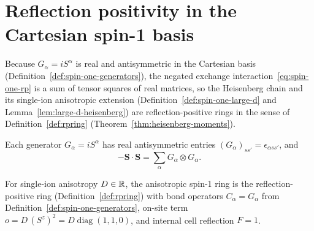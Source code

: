 \section{Reflection positivity in the Cartesian spin-1 basis}

Because \(G_\alpha = iS^\alpha\) is real and antisymmetric in the Cartesian basis
(Definition~\ref{def:spin-one-generators}), the negated exchange interaction~\eqref{eq:spin-one-rp}
is a sum of tensor squares of real matrices, so the Heisenberg chain and its single-ion anisotropic
extension (Definition~\ref{def:spin-one-large-d} and Lemma~\ref{lem:large-d-heisenberg}) are
reflection-positive rings in the sense of Definition~\ref{def:rpring}
(Theorem~\ref{thm:heisenberg-moments}).

\begin{definition}
  \label{def:spin-one-generators}
  \leanok
  Each generator \(G_\alpha = i S^\alpha\) has real antisymmetric entries \((G_\alpha)_{ss'} =
  \epsilon_{\alpha s s'}\), and
  \begin{equation}
    \label{eq:spin-one-rp}
    -\mathbf S \cdot \mathbf S = \sum_\alpha G_\alpha \otimes G_\alpha.
  \end{equation}
\end{definition}

\begin{definition}
  \label{def:spin-one-large-d}
  \leanok
  For single-ion anisotropy \(D \in \mathbb{R}\), the anisotropic spin-1 ring is the reflection-positive
  ring (Definition~\ref{def:rpring}) with bond operators \(C_\alpha = G_\alpha\) from
  Definition~\ref{def:spin-one-generators}, on-site term
  \(o = D\,(S^z)^2 = D \operatorname{diag}(1, 1, 0)\), and internal cell reflection \(F = 1\).
\end{definition}

